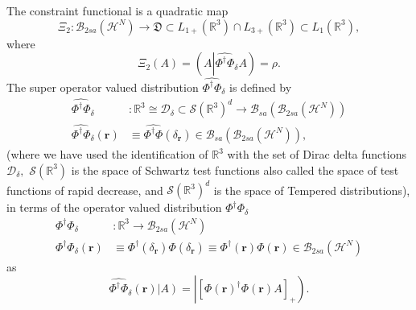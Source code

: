 \documentclass[aps,preprint]{revtex4}%
\begin{document}
The constraint functional is a quadratic map%
\begin{equation}
\Xi_{2}:\mathcal{B}_{2sa}\left(  \mathcal{H}^{N}\right)  \rightarrow
\mathfrak{D}\mathcal{\subset}L_{1+}\left(  \mathbb{R}^{3}\right)  \cap
L_{3+}\left(  \mathbb{R}^{3}\right)  \subset L_{1}\left(  \mathbb{R}%
^{3}\right)  ,
\end{equation}
where%
\begin{equation}
\Xi_{2}\left(  A\right)  =\left(  A\left\vert \widehat{\Phi^{\dagger}\Phi
}_{\delta}A\right.  \right)  =\rho.
\end{equation}
The super operator valued distribution $\widehat{\Phi^{\dagger}\Phi}_{\delta}$
is defined by
\begin{align}
\widehat{\Phi^{\dagger}\Phi}_{\delta}  &  :\mathbb{R}^{3}\cong\mathcal{D}%
_{\delta}\subset\mathcal{S}\left(  \mathbb{R}^{3}\right)  ^{d}\rightarrow
\mathcal{B}_{sa}\left(  \mathcal{B}_{2sa}\left(  \mathcal{H}^{N}\right)
\right) \nonumber\\
\widehat{\Phi^{\dagger}\Phi}_{\delta}\left(  \boldsymbol{r}\right)   &
\equiv\widehat{\Phi^{\dagger}\Phi}\left(  \delta_{\mathbf{r}}\right)
\in\mathcal{B}_{sa}\left(  \mathcal{B}_{2sa}\left(  \mathcal{H}^{N}\right)
\right)  ,
\end{align}
(where we have used the identification of $\mathbb{R}^{3}$ with the set of
Dirac delta functions $\mathcal{D}_{\delta},$ $\mathcal{S}\left(
\mathbb{R}^{3}\right)  $ is the space of Schwartz test functions also called
the space of test functions of rapid decrease, and $\mathcal{S}\left(
\mathbb{R}^{3}\right)  ^{d}$ is the space of Tempered distributions), in terms
of the operator valued distribution $\Phi^{\dagger}\Phi_{\delta}$
\begin{align}
\Phi^{\dagger}\Phi_{\delta}  &  :\mathbb{R}^{3}\rightarrow\mathcal{B}%
_{2sa}\left(  \mathcal{H}^{N}\right) \nonumber\\
\Phi^{\dagger}\Phi_{\delta}\left(  \boldsymbol{r}\right)   &  \equiv
\Phi^{\dagger}\left(  \delta_{\mathbf{r}}\right)  \Phi\left(  \delta
_{\mathbf{r}}\right)  \equiv\Phi^{\dagger}\left(  \boldsymbol{r}\right)
\Phi\left(  \boldsymbol{r}\right)  \in\mathcal{B}_{2sa}\left(  \mathcal{H}%
^{N}\right)
\end{align}
as
\begin{equation}
\widehat{\Phi^{\dagger}\Phi}_{\delta}\left(  \boldsymbol{r}\right)  \left\vert
A\right)  =\left\vert \left[  \Phi\left(  \boldsymbol{r}\right)  ^{\dagger
}\Phi\left(  \boldsymbol{r}\right)  A\right]  _{+}\right)  .
\end{equation}
\end{document}
